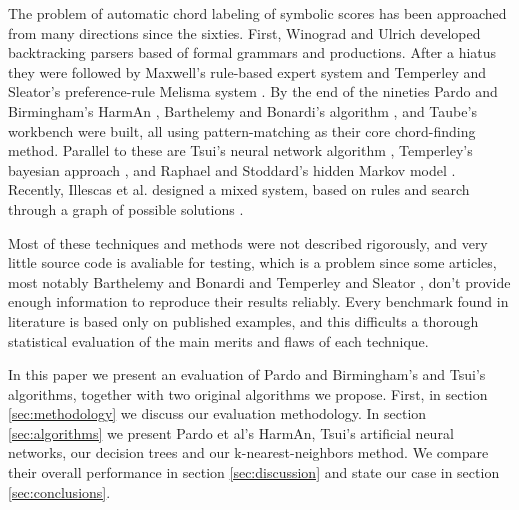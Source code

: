 \documentclass{article}
\begin{document}
The problem of automatic chord labeling of symbolic scores has been
approached from many directions since the sixties. First, Winograd
\cite{winograd68:linguistics} and Ulrich \cite{ulrich77:analysis}
developed backtracking parsers based of formal grammars and
productions. After a hiatus they were followed by Maxwell's
\cite{maxwell92:expert} rule-based expert system and Temperley and
Sleator's preference-rule Melisma system
\cite{temperley.ea99:modeling}. By the end of the nineties Pardo and
Birmingham's HarmAn \cite{barthelemy.ea01:figured}, Barthelemy and
Bonardi's algorithm \cite{pardo.ea02:algorithms}, and Taube's
workbench \cite{taube99:automatic} were built, all using
pattern-matching as their core chord-finding method. Parallel to these
are Tsui's neural network algorithm \cite{tsui02:harmonic}, Temperley's
bayesian approach \cite{temperley04:bayesian}, and Raphael and
Stoddard's hidden Markov model \cite{raphael.ea03:harmonic}. Recently,
Illescas et al. designed a mixed system, based on rules and search
through a graph of possible solutions \cite{illescas.ea07:harmonic}.

Most of these techniques and methods were not described rigorously,
and very little source code is avaliable for testing, which is a
problem since some articles, most notably Barthelemy and Bonardi
\cite{pardo.ea02:algorithms} and Temperley and Sleator
\cite{temperley.ea99:modeling}, don't provide enough information to
reproduce their results reliably. Every benchmark found in literature
\cite{pardo.ea00:automated, pardo.ea02:algorithms, tsui02:harmonic,
  taube99:automatic, illescas.ea07:harmonic} is based only on published
examples, and this difficults a thorough statistical evaluation of the
main merits and flaws of each technique.

In this paper we present an evaluation of Pardo and Birmingham's and
Tsui's algorithms, together with two original algorithms we propose.
First, in section \ref{sec:methodology} we discuss our evaluation
methodology. In section \ref{sec:algorithms} we present Pardo et al's
HarmAn, Tsui's artificial neural networks, our decision trees and our
k-nearest-neighbors method. We compare their overall performance in
section \ref{sec:discussion} and state our case in section
\ref{sec:conclusions}.
\end{document}
